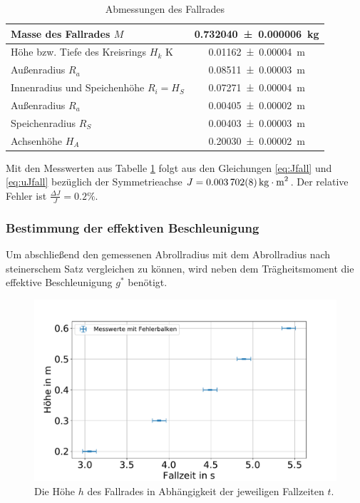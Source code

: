 \begin{table}
	\caption{Abmessungen des Fallrades}
	\begin{tabular}{|l|c|}
	\hline 
	Masse des Fallrades $M$& \SI{0.732040\pm 0.000006}{kg} \\ 
	\hline 
	Höhe bzw. Tiefe des Kreisrings $H_k$ K& \SI{0.01162\pm 0.00004}{m} \\ 
	\hline 
	Außenradius $R_a$ & \SI{0.08511\pm 0.00003}{m} \\ 
	\hline 
	Innenradius und Speichenhöhe $R_i=H_S$ & \SI{0.07271\pm 0.00004}{m}  \\ 
	\hline 
	Außenradius $R_a$	& \SI{0.00405 \pm 0.00002}{m} \\ 
	\hline 
	Speichenradius $R_S$& \SI{0.00403 \pm 0.00003}{m} \\ 
	\hline 
	Achsenhöhe $H_A$& \SI{0.20030\pm 0.00002}{m} \\ 
	\hline 

\end{tabular}
\label{tab:datafall} 
\end{table}



Mit den Messwerten aus Tabelle \ref{tab:datafall} folgt aus den Gleichungen \ref{eq:Jfall} und \ref{eq:uJfall} bezüglich der Symmetrieachse $J=\SI{0.003702 \pm 0.000008}{kg\cdot m^2}$. Der relative Fehler ist $\frac{\Delta J}{J}=0.2\%$. 








\subsubsection{Bestimmung der effektiven Beschleunigung }
Um abschließend den gemessenen Abrollradius mit dem Abrollradius nach steinerschem Satz vergleichen zu können, wird neben dem Trägheitsmoment die effektive Beschleunigung $g^*$ benötigt.





\begin{figure}[h!]
	\centering
	\includegraphics[width=0.7\linewidth]{auswertung/Fallrad/h,t}
	\caption{Die Höhe $h$ des Fallrades in Abhängigkeit der jeweiligen Fallzeiten $t$.}
	\label{fig:ht}
\end{figure}




